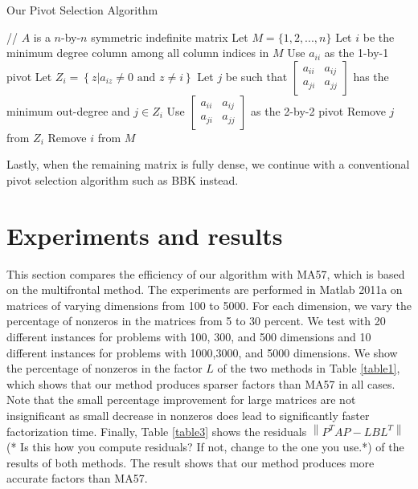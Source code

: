 \documentclass{article}
\begin{document}
\begin{algorithm}
\caption{Our Pivot Selection Algorithm}\label{algo2}
\begin{algorithmic}
\STATE // $A$ is a $n$-by-$n$ symmetric indefinite matrix
\STATE Let $M = \{1, 2, ... , n\}$
\STATE Let $i$ be the minimum degree column among all column indices in $M$
   \STATE Use $a_{ii}$ as the 1-by-1 pivot
\ELSE
   \STATE Let $Z_i = \left\{ z | a_{iz}\neq 0 \mbox{ and } z\neq i\right\}$ 
      \STATE Let $j$ be such that $\begin{bmatrix} a_{ii}  & a_{ij} \\  a_{ji} & a_{jj}\end{bmatrix}$ has the minimum out-degree and $j \in Z_i$
         \STATE Use $\begin{bmatrix} a_{ii}  & a_{ij} \\  a_{ji} & a_{jj}\end{bmatrix}$ as the 2-by-2 pivot
      \ELSE
         \STATE Remove $j$ from $Z_i$ 
      \ENDIF
   \ENDWHILE
   \STATE Remove $i$ from $M$
\ENDIF
\ENDWHILE
\end{algorithmic}
\end{algorithm}
Lastly, when the remaining matrix is fully dense, we continue with a conventional pivot selection algorithm such as BBK instead.




\section{Experiments and results} \label{sec5}

This section compares the efficiency of our algorithm with MA57, which is based on the multifrontal method. 
The experiments are performed in Matlab 2011a on matrices of varying dimensions from 100 to 5000.
For each dimension, we vary the percentage of nonzeros in the matrices from 5 to 30 percent.
We test with 20 different instances for problems with 100, 300, and 500 dimensions and 10 different instances for problems with 1000,3000, and 5000 dimensions.  We show the percentage of nonzeros in the factor $L$ of the two methods in Table \ref{table1}, which shows that our method produces sparser factors than MA57 in all cases.  Note that the small percentage improvement for large matrices are not insignificant as small decrease in nonzeros does lead to significantly faster factorization time.  Finally, Table \ref{table3} shows the residuals $\left\| P^TAP - LBL^T\right\|$ (* Is this how you compute residuals?  If not, change to the one you use.*) of the results of both methods. The result shows that our method produces more accurate factors than MA57.
\end{document}
